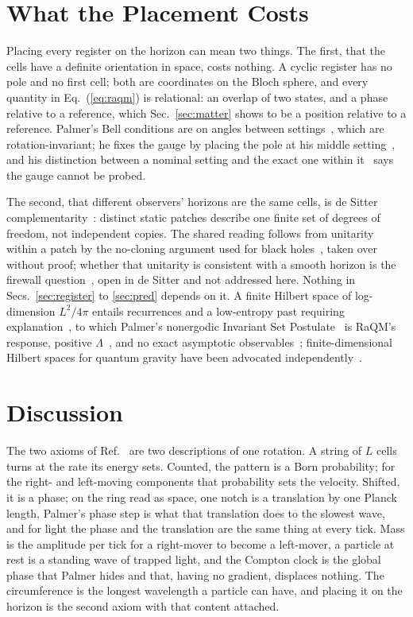 \documentclass[aps,prd,twocolumn,superscriptaddress,nofootinbib]{revtex4-2}
\begin{document}
\section{What the Placement Costs}
\label{sec:cost}

Placing every register on the horizon can mean two things. The first, that the cells have a definite orientation in space, costs nothing. A cyclic register has no pole and no first cell; both are coordinates on the Bloch sphere, and every quantity in Eq.~(\ref{eq:raqm}) is relational: an overlap of two states, and a phase relative to a reference, which Sec.~\ref{sec:matter} shows to be a position relative to a reference. Palmer's Bell conditions are on angles between settings~\cite{palmer2026b}, which are rotation-invariant; he fixes the gauge by placing the pole at his middle setting~\cite{palmer2026c}, and his distinction between a nominal setting and the exact one within it~\cite{palmer2024} says the gauge cannot be probed.

The second, that different observers' horizons are the same cells, is de Sitter complementarity~\cite{susskind1993,bousso1999,dyson2002,banksfischler2001,parikh2003}: distinct static patches describe one finite set of degrees of freedom, not independent copies. The shared reading follows from unitarity within a patch by the no-cloning argument used for black holes~\cite{susskind1994,wootters1982}, taken over without proof; whether that unitarity is consistent with a smooth horizon is the firewall question~\cite{amps2013}, open in de Sitter and not addressed here. Nothing in Secs.~\ref{sec:register} to \ref{sec:pred} depends on it. A finite Hilbert space of log-dimension $L^2/4\pi$ entails recurrences and a low-entropy past requiring explanation~\cite{dyson2002}, to which Palmer's nonergodic Invariant Set Postulate~\cite{palmer2009} is RaQM's response, positive $\Lambda$~\cite{banks2000}, and no exact asymptotic observables~\cite{witten2001}; finite-dimensional Hilbert spaces for quantum gravity have been advocated independently~\cite{buniy2005,bao2017,carroll2023}.

\section{Discussion}
\label{sec:discussion}

The two axioms of Ref.~\cite{korytko2026} are two descriptions of one rotation. A string of $L$ cells turns at the rate its energy sets. Counted, the pattern is a Born probability; for the right- and left-moving components that probability sets the velocity. Shifted, it is a phase; on the ring read as space, one notch is a translation by one Planck length, Palmer's phase step is what that translation does to the slowest wave, and for light the phase and the translation are the same thing at every tick. Mass is the amplitude per tick for a right-mover to become a left-mover, a particle at rest is a standing wave of trapped light, and the Compton clock is the global phase that Palmer hides and that, having no gradient, displaces nothing. The circumference is the longest wavelength a particle can have, and placing it on the horizon is the second axiom with that content attached.
\end{document}
